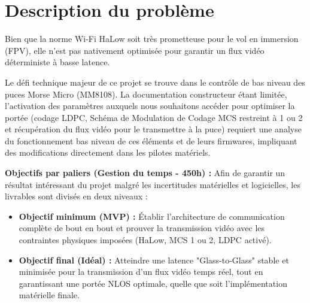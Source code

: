 \section{Description du problème}
Bien que la norme Wi-Fi HaLow soit très prometteuse pour le vol en immersion (FPV), elle n'est 
pas nativement optimisée pour garantir un flux vidéo déterministe à basse latence.

Le défi technique majeur de ce projet se trouve dans le contrôle de bas niveau des puces 
Morse Micro (MM8108). La documentation constructeur étant limitée, l'activation des paramètres 
auxquels nous souhaitons accéder pour optimiser la portée (codage LDPC, Schéma de Modulation de 
Codage MCS restreint à 1 ou 2 et récupération du flux vidéo pour le transmettre à la puce)
requiert une analyse du fonctionnement bas niveau de ces éléments et de leurs firmwares, impliquant 
des modifications directement dans les pilotes matériels.\newline

\textbf{Objectifs par paliers (Gestion du temps - 450h) :}\newline
Afin de garantir un résultat intéressant du projet malgré les incertitudes matérielles et 
logicielles, les livrables sont divisés en deux niveaux :

\begin{itemize}
    \item \textbf{Objectif minimum (MVP) :} Établir l'architecture de communication complète de bout 
    en bout et prouver la transmission vidéo avec les contraintes physiques imposées (HaLow, MCS 1 ou 2, LDPC activé).
    \item \textbf{Objectif final (Idéal) :} Atteindre une latence "Glass-to-Glass" stable et minimisée 
    pour la transmission d'un flux vidéo temps réel, tout en garantissant une portée NLOS optimale, quelle 
    que soit l'implémentation matérielle finale.\newline
\end{itemize}

